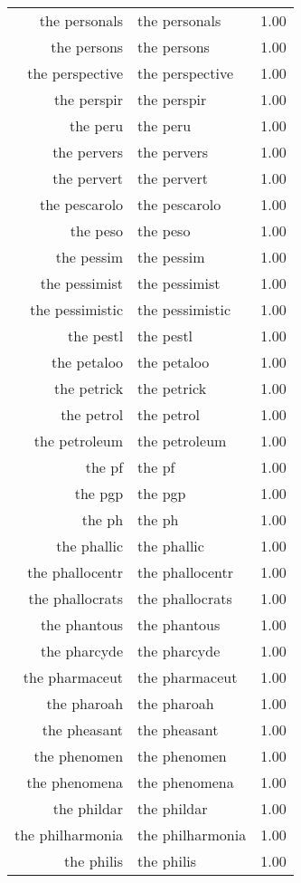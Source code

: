 \begin{table}[ht]
\begin{tabular}{rlr}
  the personals & the personals & 1.00 \\ 
  the persons & the persons & 1.00 \\ 
  the perspective & the perspective & 1.00 \\ 
  the perspir & the perspir & 1.00 \\ 
  the peru & the peru & 1.00 \\ 
  the pervers & the pervers & 1.00 \\ 
  the pervert & the pervert & 1.00 \\ 
  the pescarolo & the pescarolo & 1.00 \\ 
  the peso & the peso & 1.00 \\ 
  the pessim & the pessim & 1.00 \\ 
  the pessimist & the pessimist & 1.00 \\ 
  the pessimistic & the pessimistic & 1.00 \\ 
  the pestl & the pestl & 1.00 \\ 
  the petaloo & the petaloo & 1.00 \\ 
  the petrick & the petrick & 1.00 \\ 
  the petrol & the petrol & 1.00 \\ 
  the petroleum & the petroleum & 1.00 \\ 
  the pf & the pf & 1.00 \\ 
  the pgp & the pgp & 1.00 \\ 
  the ph & the ph & 1.00 \\ 
  the phallic & the phallic & 1.00 \\ 
  the phallocentr & the phallocentr & 1.00 \\ 
  the phallocrats & the phallocrats & 1.00 \\ 
  the phantous & the phantous & 1.00 \\ 
  the pharcyde & the pharcyde & 1.00 \\ 
  the pharmaceut & the pharmaceut & 1.00 \\ 
  the pharoah & the pharoah & 1.00 \\ 
  the pheasant & the pheasant & 1.00 \\ 
  the phenomen & the phenomen & 1.00 \\ 
  the phenomena & the phenomena & 1.00 \\ 
  the phildar & the phildar & 1.00 \\ 
  the philharmonia & the philharmonia & 1.00 \\ 
  the philis & the philis & 1.00 \\ 

\end{tabular}
\end{table}
